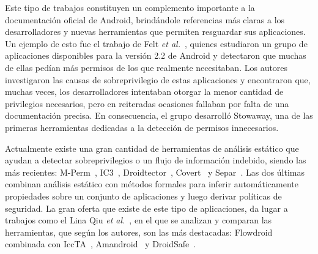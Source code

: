 
Este tipo de trabajos constituyen un complemento importante a la documentación
oficial de Android, brindándole referencias más claras a los desarrolladores y
nuevas herramientas que permiten resguardar sus aplicaciones. Un ejemplo de esto
fue el trabajo de Felt \textit{et al.}~\cite{felt}, quienes estudiaron un grupo
de aplicaciones disponibles para la versión 2.2 de Android y detectaron que
muchas de ellas pedían más permisos de los que realmente necesitaban. Los
autores investigaron las causas de sobreprivilegio de estas aplicaciones y
encontraron que, muchas veces, los desarrolladores intentaban otorgar la menor
cantidad de privilegios necesarios, pero en reiteradas ocasiones fallaban por
falta de una documentación precisa. En consecuencia, el grupo desarrolló
Stowaway, una de las primeras herramientas dedicadas a la detección de permisos
innecesarios.

Actualmente existe una gran cantidad de herramientas de análisis estático que
ayudan a detectar sobreprivilegios o un flujo de información indebido, siendo
las más recientes:
%
M-Perm~\cite{mperm},
%
IC3~\cite{ic3},
Droidtector~\cite{droidtector},
Covert~\cite{covert} y Separ~\cite{separ}.
Las dos últimas combinan análisis estático con métodos formales para inferir
automáticamente propiedades sobre un conjunto de aplicaciones y luego derivar
políticas de seguridad. La gran oferta que existe de este tipo de aplicaciones,
da lugar a trabajos como el Lina Qiu \textit{et al.}~\cite{qiu}, en el que se
analizan y comparan las herramientas, que según los autores, son las más
destacadas: Flowdroid combinada con IccTA~\cite{iccta},
Amandroid~\cite{amandroid} y DroidSafe~\cite{droidsafe}.

